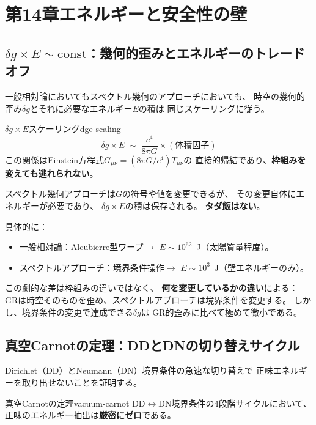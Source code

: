 \section{第14章\quad エネルギーと安全性の壁}
\label{ch:energy-safety}

\subsection{$\delta g \times E \sim \mathrm{const}$：幾何的歪みとエネルギーのトレードオフ}
\label{sec:14.1}

一般相対論においてもスペクトル幾何のアプローチにおいても、
時空の幾何的歪み$\delta g$とそれに必要なエネルギー$E$の積は
同じスケーリングに従う。

\begin{keyresult}{$\delta g \times E$スケーリング}{dge-scaling}
\[
\delta g \times E \;\sim\; \frac{c^4}{8\pi G} \times (\text{体積因子})
\]
この関係はEinstein方程式$G_{\mu\nu} = (8\pi G/c^4) T_{\mu\nu}$の
直接的帰結であり、\textbf{枠組みを変えても逃れられない}。

スペクトル幾何アプローチは$G$の符号や値を変更できるが、
その変更自体にエネルギーが必要であり、
$\delta g \times E$の積は保存される。
\textbf{タダ飯はない}。
\end{keyresult}

\noindent
具体的に：
\begin{itemize}
\item 一般相対論：Alcubierre型ワープ$\to$ $E \sim 10^{62}$~J（太陽質量程度）。
\item スペクトルアプローチ：境界条件操作$\to$ $E \sim 10^3$~J（壁エネルギーのみ）。
\end{itemize}
この劇的な差は枠組みの違いではなく、
\textbf{何を変更しているかの違い}による：
GRは時空そのものを歪め、スペクトルアプローチは境界条件を変更する。
しかし、境界条件の変更で達成できる$\delta g$は
GR的歪みに比べて極めて微小である。


\subsection{真空Carnotの定理：DDとDNの切り替えサイクル}
\label{sec:14.2}

Dirichlet（DD）とNeumann（DN）境界条件の急速な切り替えで
正味エネルギーを取り出せないことを証明する。

\begin{keytheorem}{真空Carnotの定理}{vacuum-carnot}
DD$\leftrightarrow$DN境界条件の4段階サイクルにおいて、
正味のエネルギー抽出は\textbf{厳密にゼロ}である。
\end{keytheorem}


